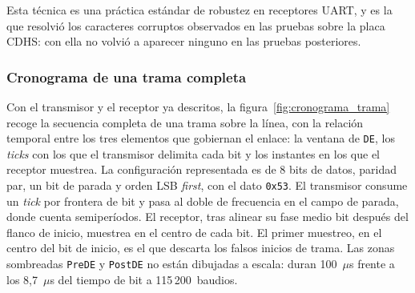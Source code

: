 Esta técnica es una práctica estándar de robustez en receptores UART, y es la que resolvió los
caracteres corruptos observados en las pruebas sobre la placa CDHS: con ella no volvió a aparecer
ninguno en las pruebas posteriores.

\subsubsection{Cronograma de una trama completa}

Con el transmisor y el receptor ya descritos, la figura~\ref{fig:cronograma_trama} recoge la
secuencia completa de una trama sobre la línea, con la relación temporal entre los tres elementos
que gobiernan el enlace: la ventana de \texttt{DE}, los \textit{ticks} con los que el transmisor
delimita cada bit y los instantes en los que el receptor muestrea. La configuración representada es
de 8 bits de datos, paridad par, un bit de parada y orden LSB \textit{first}, con el dato
\texttt{0x53}. El transmisor consume un \textit{tick} por frontera de bit y pasa al doble de
frecuencia en el campo de parada, donde cuenta semiperíodos. El receptor, tras alinear su fase
medio bit después del flanco de inicio, muestrea en el centro de cada bit. El primer muestreo, en
el centro del bit de inicio, es el que descarta los falsos inicios de trama. Las zonas sombreadas
\texttt{PreDE} y \texttt{PostDE} no están dibujadas a escala: duran 100~$\mu$s frente a los
8,7~$\mu$s del tiempo de bit a 115\,200~baudios.

